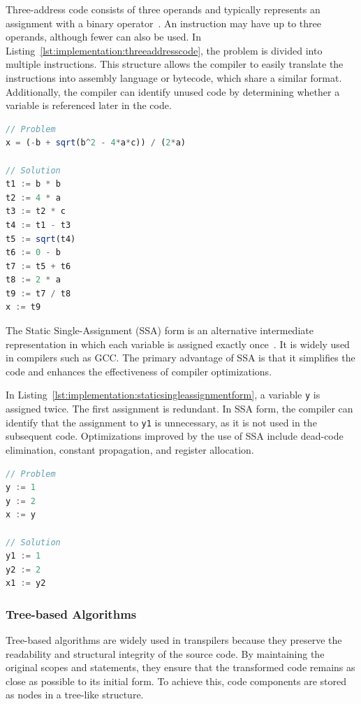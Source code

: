 Three-address code consists of three operands and typically represents an assignment with a binary operator~\cite{wiki:threeaddress}. An instruction may have up to three operands, although fewer can also be used. In Listing~\ref{lst:implementation:threeaddresscode}, the problem is divided into multiple instructions. This structure allows the compiler to easily translate the instructions into assembly language or bytecode, which share a similar format. Additionally, the compiler can identify unused code by determining whether a variable is referenced later in the code.

\begin{lstlisting}[float,language=TypeScript,caption=Three-address code,label=lst:implementation:threeaddresscode]
// Problem
x = (-b + sqrt(b^2 - 4*a*c)) / (2*a)

// Solution
t1 := b * b
t2 := 4 * a
t3 := t2 * c
t4 := t1 - t3
t5 := sqrt(t4)
t6 := 0 - b
t7 := t5 + t6
t8 := 2 * a
t9 := t7 / t8
x := t9
\end{lstlisting}

The Static Single-Assignment (SSA) form is an alternative intermediate representation in which each variable is assigned exactly once~\cite{wiki:singlestatic}. It is widely used in compilers such as GCC. The primary advantage of SSA is that it simplifies the code and enhances the effectiveness of compiler optimizations.

In Listing~\ref{lst:implementation:staticsingleassignmentform}, a variable \lstinline|y| is assigned twice. The first assignment is redundant. In SSA form, the compiler can identify that the assignment to \lstinline|y1| is unnecessary, as it is not used in the subsequent code. Optimizations improved by the use of SSA include dead-code elimination, constant propagation, and register allocation.

\begin{lstlisting}[language=TypeScript,caption=Static single-assignment form,label=lst:implementation:staticsingleassignmentform]
// Problem
y := 1
y := 2
x := y

// Solution
y1 := 1
y2 := 2
x1 := y2
\end{lstlisting}

\subsubsection{Tree-based Algorithms}

Tree-based algorithms are widely used in \gls{transpiler}s because they preserve the readability and structural integrity of the source code. By maintaining the original scopes and statements, they ensure that the transformed code remains as close as possible to its initial form. To achieve this, code components are stored as nodes in a tree-like structure.

